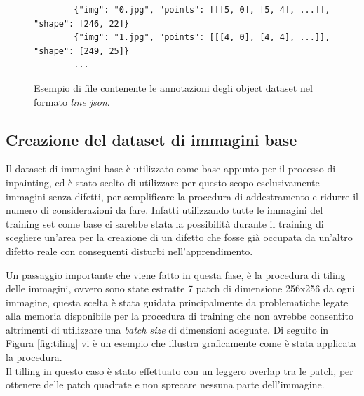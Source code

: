 \begin{figure}[H]
    \begin{verbatim}
        {"img": "0.jpg", "points": [[[5, 0], [5, 4], ...]], "shape": [246, 22]}
        {"img": "1.jpg", "points": [[[4, 0], [4, 4], ...]], "shape": [249, 25]}
        ...
    \end{verbatim}
    \caption{Esempio di file contenente le annotazioni degli object dataset nel formato \textit{line json}.}
\end{figure}

\subsection{Creazione del dataset di immagini base}

Il dataset di immagini base è utilizzato come base appunto per il processo di inpainting, ed è stato scelto di utilizzare per questo scopo
esclusivamente immagini senza difetti, per semplificare la procedura di addestramento e ridurre il numero di considerazioni da fare.
Infatti utilizzando tutte le immagini del training set come base ci sarebbe stata la possibilità durante il training
di scegliere un'area per la creazione di un difetto che fosse già occupata da un'altro difetto reale con conseguenti disturbi nell'apprendimento.

Un passaggio importante che viene fatto in questa fase, è la procedura di tiling delle immagini, ovvero sono state estratte
7 patch di dimensione 256x256 da ogni immagine, questa scelta è stata guidata principalmente da problematiche legate alla memoria disponibile
per la procedura di training che non avrebbe consentito altrimenti di utilizzare una \textit{batch size} di dimensioni adeguate.
Di seguito in Figura \ref{fig:tiling} vi è un esempio che illustra graficamente come è stata applicata la procedura.\\
Il tilling in questo caso è stato effettuato con un leggero overlap tra le patch, per ottenere delle patch quadrate e
non sprecare nessuna parte dell'immagine.\\


